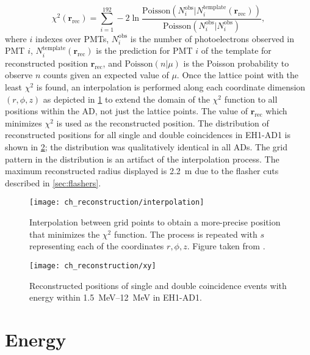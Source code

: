 \begin{equation}
    \chi^2(\textbf{r}_{\text{rec}}) = \sum_{i=1}^{192} -2\ln\frac{
        \text{Poisson}(N_i^{\text{obs}} \vert N_i^{\text{template}}(\textbf{r}_{\text{rec}}))
    }
    {
        \text{Poisson}(N_i^{\text{obs}} \vert N_i^{\text{obs}})
    },
\end{equation}
where $i$ indexes over PMTs,
$N_i^{\text{obs}}$ is the number of photoelectrons observed in PMT $i$,
$N_{i}^{\text{template}}(\textbf{r}_{\text{rec}})$ is the prediction
for PMT $i$ of the template for reconstructed position $\textbf{r}_{\text{rec}}$,
and $\text{Poisson}(n\vert\mu)$ is the Poisson probability
to observe $n$ counts given an expected value of $\mu$.
Once the lattice point with the least $\chi^2$ is found,
an interpolation is performed along each coordinate dimension $(r, \phi, z)$
as depicted in \cref{fig:interpolation}
to extend the domain of the $\chi^2$ function to all positions within the AD,
not just the lattice points.
The value of $\textbf{r}_{\text{rec}}$ which minimizes $\chi^2$
is used as the reconstructed position.
The distribution of reconstructed positions
for all single and double coincidences in EH1-AD1
is shown in \cref{fig:position_map};
the distribution was qualitatively identical in all ADs.
The grid pattern in the distribution is an artifact of the interpolation process.
The maximum reconstructed radius displayed is \SI{2.2}{\m}
due to the flasher cuts described in \cref{sec:flashers}.

\begin{figure}
    \centering
    \texttt{[image: ch\_reconstruction/interpolation]}
    \caption[Position reconstruction interpolation]{
        Interpolation between grid points to obtain a more-precise position
        that minimizes the $\chi^2$ function.
        The process is repeated with $s$ representing each of the coordinates
        $r, \phi, z$.
        Figure taken from \cite{adsimple1}.
    }
    \label{fig:interpolation}
\end{figure}

\begin{figure}
    \centering
    \texttt{[image: ch\_reconstruction/xy]}
    \caption[Reconstructed position distribution]{
        Reconstructed positions of single and double coincidence events
        with energy within \SIrange{1.5}{12}{\MeV} in EH1-AD1.
    }
    \label{fig:position_map}
\end{figure}

\section{Energy}
\label{sec:reco_energy}

